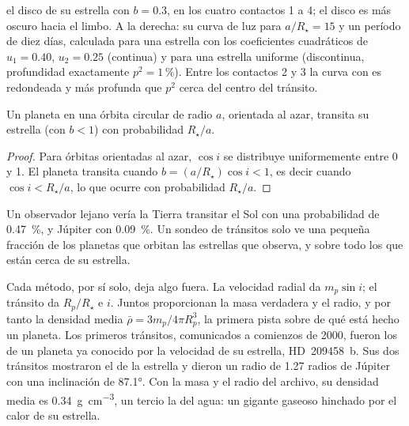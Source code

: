 \begin{omfigure}
{el disco de su estrella con  $b = 0.3$, en los cuatro
contactos 1 a 4; el disco es más oscuro hacia el limbo. A la derecha: su curva de luz
para $a/R_\star = 15$ y un período de diez días, calculada para una estrella
con los coeficientes cuadráticos de  $u_1 = 0.40$, $u_2 = 0.25$
(continua) y para una estrella uniforme (discontinua, profundidad exactamente $p^2 = 1\,\%$).
Entre los contactos 2 y 3 la curva con  es redondeada y más profunda
que $p^2$ cerca del centro del tránsito.}\label{fig:b3:exoplanets:transit}
\end{omfigure}

\begin{proposition}\label{prop:b3:exoplanets:probability}
Un planeta en una órbita circular de radio $a$, orientada al azar, transita
su estrella (con $b < 1$) con probabilidad $R_\star/a$.
\end{proposition}

\begin{proof}
Para órbitas orientadas al azar, $\cos i$ se distribuye uniformemente
entre 0 y 1. El planeta transita cuando $b = (a/R_\star)\cos i < 1$, es decir
cuando $\cos i < R_\star/a$, lo que ocurre con probabilidad $R_\star/a$.
\end{proof}

Un observador lejano vería la Tierra transitar el Sol con una probabilidad
de \qty{0.47}{\percent}, y Júpiter con \qty{0.09}{\percent}. Un sondeo de
tránsitos solo ve una pequeña fracción de los planetas que orbitan las estrellas
que observa, y sobre todo los que están cerca de su estrella.

Cada método, por sí solo, deja algo fuera. La velocidad radial da
$m_p\sin i$; el tránsito da $R_p/R_\star$ e $i$. Juntos proporcionan
la masa verdadera y el radio, y por tanto la densidad media
$\bar\rho = 3m_p/4\pi R_p^3$, la primera pista sobre de qué está hecho un planeta.
Los primeros tránsitos, comunicados a comienzos de 2000, fueron los de un planeta
ya conocido por la velocidad de su estrella, HD~209458~b. Sus dos tránsitos
mostraron el  de la estrella y dieron un radio de 1.27 radios de Júpiter con una inclinación de
\ang{87.1}. Con la masa y el radio del archivo, su densidad media es
\qty{0.34}{g.cm^{-3}}, un tercio la del agua: un gigante gaseoso hinchado por
el calor de su estrella.

